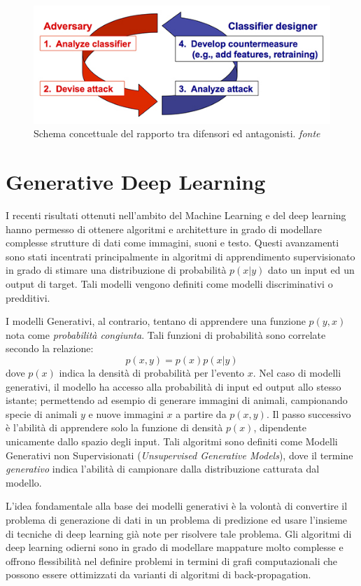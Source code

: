 \begin{figure}[!bp]
	\centering
	\includegraphics[width=\columnwidth]{figures/Reactive_arms_race.jpg}
	\caption{Schema concettuale del rapporto tra difensori ed antagonisti. \textit{fonte}%
	~\cite{wiki:Adversarial_machine_learning} \label{fig:advarms} }
\end{figure}


\newpage
\section{Generative Deep Learning}
\label{sec:gan}
I recenti risultati ottenuti nell'ambito del Machine Learning e del deep learning hanno permesso di ottenere algoritmi e architetture in grado di modellare complesse strutture di dati come immagini, suoni e testo. Questi avanzamenti sono stati incentrati principalmente in algoritmi di apprendimento supervisionato in grado di stimare una distribuzione di probabilità $p(x|y)$ dato un input ed un output di target. Tali modelli vengono definiti come modelli discriminativi o predditivi.

I modelli Generativi, al contrario, tentano di apprendere una funzione $p(y,x)$ nota come \textit{probabilità congiunta}. Tali funzioni di probabilità sono correlate secondo la relazione: 
\[p(x,y)=p(x)p(x|y)\]
dove $p(x)$ indica la densità di probabilità per l'evento $x$. 
Nel caso di modelli generativi, il modello ha accesso alla probabilità di input ed output allo stesso istante; permettendo ad esempio di generare immagini di animali, campionando specie di animali $y$ e nuove immagini $x$ a partire da $p(x,y)$.
Il passo successivo è l'abilità di apprendere solo la funzione di densità $p(x)$, dipendente unicamente dallo spazio degli input. Tali algoritmi sono definiti come Modelli Generativi non Supervisionati (\textit{Unsupervised Generative Models}), dove il termine \textit{generativo} indica l'abilità di campionare dalla distribuzione catturata dal modello. 

L'idea fondamentale alla base dei modelli generativi è la volontà di convertire il problema di generazione di dati in un problema di predizione ed usare l'insieme di tecniche di deep learning già note per risolvere tale problema. Gli algoritmi di deep learning odierni sono in grado di modellare mappature molto complesse e offrono flessibilità nel definire problemi in termini di grafi computazionali che possono essere ottimizzati da varianti di algoritmi di back-propagation.

